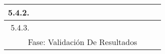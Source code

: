 \documentclass[12pt]{article}
\begin{document}
\begin{table}[H]
{\begin{tabular}{|rllllllllllllllll|}
			\multicolumn{1}{|r|}{5.4.2.}                                       & \multicolumn{1}{l|}{}                          & \multicolumn{1}{l|}{}                          & \multicolumn{1}{l|}{}                          & \multicolumn{1}{l|}{}                          & \multicolumn{1}{l|}{}                          & \multicolumn{1}{l|}{}                          & \multicolumn{1}{l|}{}                          & \multicolumn{1}{l|}{}                          & \multicolumn{1}{l|}{}                          & \multicolumn{1}{l|}{}                           & \multicolumn{1}{c|}{\cellcolor[HTML]{B4A7D6}}   & \multicolumn{1}{c|}{\cellcolor[HTML]{B4A7D6}}   & \multicolumn{1}{c|}{\cellcolor[HTML]{EA9999}}   & \multicolumn{1}{l|}{}                           & \multicolumn{1}{l|}{}                           &                                                 \\ \hline
			\multicolumn{1}{|r|}{5.4.3.}                                       & \multicolumn{1}{l|}{}                          & \multicolumn{1}{l|}{}                          & \multicolumn{1}{l|}{}                          & \multicolumn{1}{l|}{}                          & \multicolumn{1}{l|}{}                          & \multicolumn{1}{l|}{}                          & \multicolumn{1}{l|}{}                          & \multicolumn{1}{l|}{}                          & \multicolumn{1}{l|}{}                          & \multicolumn{1}{l|}{}                           & \multicolumn{1}{l|}{}                           & \multicolumn{1}{l|}{}                           & \multicolumn{1}{c|}{\cellcolor[HTML]{EA9999}}   & \multicolumn{1}{l|}{}                           & \multicolumn{1}{l|}{}                           &                                                 \\ \hline
			\multicolumn{17}{|c|}{\cellcolor[HTML]{D9D9D9}Fase: Validación De Resultados}                                                                                                                                                                                                                                                                                                                                                                                                                                                                                                                                                                                                                                                                                                                                                                                                             \\ \hline

\end{tabular}}
\end{table}
\end{document}
